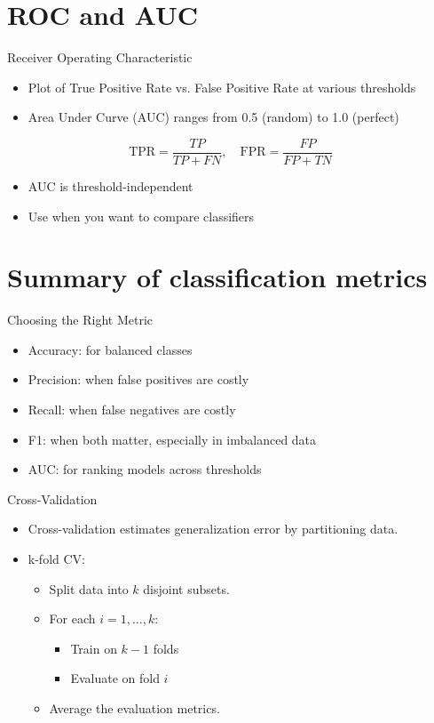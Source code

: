 \documentclass[aspectratio=169]{beamer}
\begin{document}
\section{ROC and AUC}
\label{sec:org4ae8d3a}
\begin{frame}[label={sec:orge28c4b9}]{Receiver Operating Characteristic}
\begin{itemize}
\item Plot of True Positive Rate vs. False Positive Rate at various thresholds
\item Area Under Curve (AUC) ranges from 0.5 (random) to 1.0 (perfect)
\end{itemize}

\[
\text{TPR} = \frac{TP}{TP + FN}, \quad \text{FPR} = \frac{FP}{FP + TN}
\]

\begin{itemize}
\item AUC is threshold-independent
\item Use when you want to compare classifiers
\end{itemize}
\end{frame}

\section{Summary of classification metrics}
\label{sec:orgee144ba}
\begin{frame}[label={sec:org36277e9}]{Choosing the Right Metric}
\begin{itemize}
\item Accuracy: for balanced classes
\item Precision: when false positives are costly
\item Recall: when false negatives are costly
\item F1: when both matter, especially in imbalanced data
\item AUC: for ranking models across thresholds
\end{itemize}
\end{frame}


\begin{frame}[label={sec:org62667be}]{Cross-Validation}
\begin{itemize}
\item Cross-validation estimates generalization error by partitioning data.
\item \alert{k-fold CV}:
\begin{itemize}
\item Split data into \(k\) disjoint subsets.
\item For each \(i = 1, \ldots, k\):
\begin{itemize}
\item Train on \(k-1\) folds
\item Evaluate on fold \(i\)
\end{itemize}
\item Average the evaluation metrics.
\end{itemize}
\end{itemize}
\end{frame}
\end{document}

